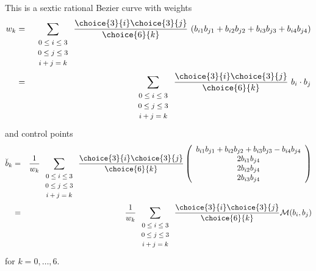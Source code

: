 \documentclass[12pt]{article}
\begin{document}
This is a sextic rational Bezier curve with weights 
\begin{eqnarray}
\label{eq:weights}
w_k & = & \sum_{\begin{array}{c} \mbox{\footnotesize{$0 \leq i \leq 3$}} \\ 
			     \mbox{\footnotesize{$0 \leq j \leq 3$}} \\ 
			     \mbox{\footnotesize{$i+j=k$}}
			     \end{array}}
        \frac{\choice{3}{i} \choice{3}{j}}{\choice{6}{k}}
	\ (b_{i1} b_{j1} + b_{i2} b_{j2} + b_{i3} b_{j3} + b_{i4} b_{j4}) \nonumber \\
& = & \sum_{\begin{array}{c} \mbox{\footnotesize{$0 \leq i \leq 3$}} \\ 
			     \mbox{\footnotesize{$0 \leq j \leq 3$}} \\ 
			     \mbox{\footnotesize{$i+j=k$}}
			     \end{array}}
        \frac{\choice{3}{i} \choice{3}{j}}{\choice{6}{k}}
	\ b_i \cdot b_j
\end{eqnarray}
and control points 
\begin{eqnarray}
\label{eq:control-pts}
\breve{b}_k & = & \frac{1}{w_k} 
      \sum_{\begin{array}{c} \mbox{\footnotesize{$0 \leq i \leq 3$}} \\ 
			     \mbox{\footnotesize{$0 \leq j \leq 3$}} \\ 
			     \mbox{\footnotesize{$i+j=k$}}
			     \end{array}} 
        \frac{\choice{3}{i} \choice{3}{j}}{\choice{6}{k}}
	\left( \begin{array}{c}
            b_{i1} b_{j1} + b_{i2} b_{j2} + b_{i3} b_{j3} - b_{i4} b_{j4} \\
            2b_{i1} b_{j4} \\
            2b_{i2} b_{j4} \\
            2b_{i3} b_{j4} 
	\end{array} \right) \nonumber \\
& = & \frac{1}{w_k} 
      \sum_{\begin{array}{c} \mbox{\footnotesize{$0 \leq i \leq 3$}} \\ 
			     \mbox{\footnotesize{$0 \leq j \leq 3$}} \\ 
			     \mbox{\footnotesize{$i+j=k$}}
			     \end{array}} 
        \frac{\choice{3}{i} \choice{3}{j}}{\choice{6}{k}}
{\cal M}(b_i, b_j)
\end{eqnarray}
for $k = 0, \ldots, 6$.
\end{document}
